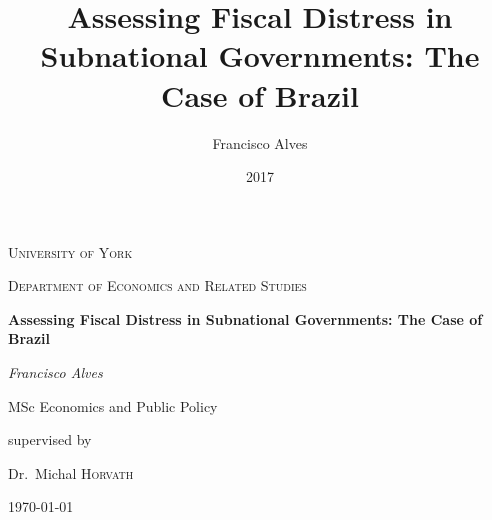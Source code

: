 \documentclass[12pt,oneside,a4paper]{report}
\title{Assessing Fiscal Distress in Subnational Governments: The Case of Brazil}
\author{Francisco Alves}
\date{2017}
\begin{document}
\begin{titlepage}
    \centering
    {\scshape\LARGE University of York\par}
    \vspace{1cm}
    {\scshape\Large Department of Economics and Related Studies\par}
    \vspace{1.5cm}
    {\huge\bfseries Assessing Fiscal Distress in Subnational Governments: The Case of Brazil\par}
    \vspace{2cm}
    {\Large\itshape Francisco Alves\par}
    {MSc Economics and Public Policy\par}
    \vfill
    supervised by\par
    Dr.~Michal \textsc{Horvath}

    \vfill

    {\large \today\par}
\end{titlepage}


\tableofcontents





{\footnotesize
}

% 
\end{document}
